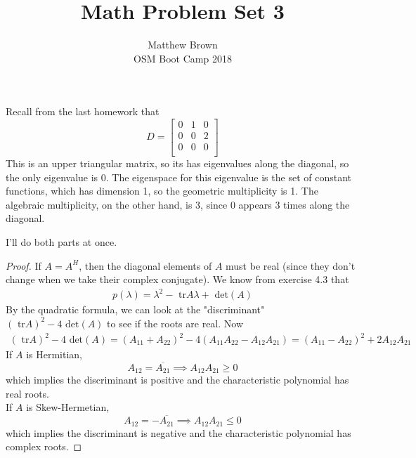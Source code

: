 \documentclass[12pt]{article}
\newenvironment{problem}[2][Problem]{\begin{trivlist}
\item[\hskip \labelsep {\bfseries #1}\hskip \labelsep {\bfseries #2.}]}{\end{trivlist}}
\theoremstyle{definition}
\theoremstyle{definition}
\theoremstyle{definition}
\theoremstyle{definition}
\begin{document}
\title{Math Problem Set 3}
\author{Matthew Brown\\ 
OSM Boot Camp 2018} %
 
\maketitle
 
\begin{problem}{4.2}
Recall from the last homework that 
$$
D = \begin{bmatrix}
0 & 1 & 0\\
0 & 0 & 2\\
0 & 0 & 0\\
\end{bmatrix}
$$
This is an upper triangular matrix, so its has eigenvalues along the diagonal, so the only eigenvalue is 0. The eigenspace for this eigenvalue is the set of constant functions, which has dimension 1, so the geometric multiplicity is 1. The algebraic multiplicity, on the other hand, is 3, since 0 appears 3 times along the diagonal.
\end{problem}

\begin{problem}{4.4} I'll do both parts at once. \\
\begin{proof} If $A = A^H$, then the diagonal elements of $A$ must be real (since they don't change when we take their complex conjugate). We know from exercise 4.3 that 
\begin{align*}
p(\lambda ) = \lambda^2 - \text{ tr}A\lambda + \text{ det} (A)
\end{align*}
By the quadratic formula, we can look at the "discriminant" $(\text{ tr}A)^2 - 4\text{ det} (A)$ to see if the roots are real. Now 
\begin{align*}
(\text{ tr}A)^2 - 4\text{ det} (A) = (A_{11} + A_{22})^2 - 4(A_{11}A_{22} - A_{12}A_{21}) = (A_{11} - A_{22})^2 + 2A_{12} A_{21}
\end{align*}
If $A$ is Hermitian, 
$$A_{12} = \overline{A_{21}} \implies A_{12}A_{21} \geq 0 $$ 
which implies the discriminant is positive and the characteristic polynomial has real roots. \\
If $A$ is Skew-Hermetian, 
$$A_{12} = - \overline{A_{21}} \implies A_{12}A_{21} \leq 0 $$
which implies the discriminant is negative and the characteristic polynomial has complex roots.
\end{proof}
\end{problem}
\end{document}
